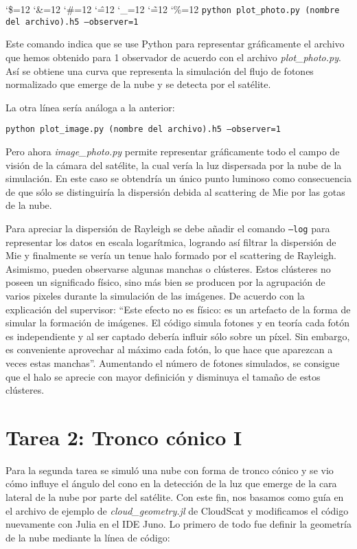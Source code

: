 \documentclass[10pt,letterpaper]{article}
\newenvironment{simplechar}{%
   \catcode`\$=12
   \catcode`\&=12
   \catcode`\#=12
   \catcode`\^=12
   \catcode`\_=12
   \catcode`\~=12
   \catcode`\%=12}{}
\begin{document}
\begin{simplechar}
\medskip
\texttt{python plot_photo.py (nombre del archivo).h5 ---observer=1}

\medskip
\noindent
Este comando indica que se use Python para representar gráficamente el archivo que hemos obtenido para 1 observador de acuerdo con el archivo \textit{plot_photo.py}. Así se obtiene una curva que representa la simulación del flujo de fotones normalizado que emerge de la nube y se detecta por el satélite.

\bigskip
La otra línea sería análoga a la anterior: 

\medskip
\texttt{python plot_image.py (nombre del archivo).h5 ---observer=1}

\medskip
\noindent
Pero ahora \textit{image_photo.py} permite representar gráficamente todo el campo de visión de la cámara del satélite, la cual vería la luz dispersada por la nube de la simulación. En este caso se obtendría un único punto luminoso como consecuencia de que sólo se distinguiría la dispersión debida al scattering de Mie por las gotas de la nube. 

\bigskip
Para apreciar la dispersión de Rayleigh se debe añadir el comando \texttt{---log} para representar los datos en escala logarítmica, logrando así filtrar la dispersión de Mie y finalmente se vería un tenue halo formado por el scattering de Rayleigh. Asimismo, pueden observarse algunas manchas o clústeres. Estos clústeres no poseen un significado físico, sino más bien se producen por la agrupación de varios pixeles durante la simulación de las imágenes. De acuerdo con la explicación del supervisor: “Este efecto no es físico: es un artefacto de la forma de simular la formación de imágenes. El código simula fotones y en teoría cada fotón es independiente y al ser captado debería influir sólo sobre un píxel. Sin embargo, es conveniente aprovechar al máximo cada fotón, lo que hace que aparezcan a veces estas manchas”. Aumentando el número de fotones simulados, se consigue que el halo se aprecie con mayor definición y disminuya el tamaño de estos clústeres.


\section{Tarea 2: Tronco cónico I}
Para la segunda tarea se simuló una nube con forma de tronco cónico y se vio cómo influye el ángulo del cono en la detección de la luz que emerge de la cara lateral de la nube por parte del satélite. Con este fin, nos basamos como guía en el archivo de ejemplo de \textit{cloud_geometry.jl} de CloudScat y modificamos el código nuevamente con Julia en el IDE Juno. Lo primero de todo fue definir la geometría de la nube mediante la línea de código:


\end{simplechar}
\end{document}
